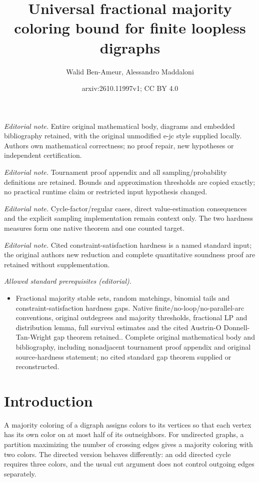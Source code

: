 \documentclass[10pt,a4paper]{article}
\title{Universal fractional majority coloring bound for finite loopless digraphs}
\author{Walid Ben-Ameur, Alessandro Maddaloni}
\date{arxiv:2610.11997v1; CC BY 4.0}
\begin{document}
\maketitle
\noindent\textit{Editorial note.} Entire original mathematical body, diagrams and embedded bibliography retained, with the original unmodified e-jc style supplied locally. Authors own mathematical correctness; no proof repair, new hypotheses or independent certification.\par\medskip
\noindent\textit{Editorial note.} Tournament proof appendix and all sampling/probability definitions are retained. Bounds and approximation thresholds are copied exactly; no practical runtime claim or restricted input hypothesis changed.\par\medskip
\noindent\textit{Editorial note.} Cycle-factor/regular cases, direct value-estimation consequences and the explicit sampling implementation remain context only. The two hardness measures form one native theorem and one counted target.\par\medskip
\noindent\textit{Editorial note.} Cited constraint-satisfaction hardness is a named standard input; the original authors new reduction and complete quantitative soundness proof are retained without supplementation.\par\medskip
\noindent\textit{Allowed standard prerequisites (editorial).}\begin{itemize}
\item Fractional majority stable sets, random matchings, binomial tails and constraint-satisfaction hardness gaps. Native finite/no-loop/no-parallel-arc conventions, original outdegrees and majority thresholds, fractional LP and distribution lemma, full survival estimates and the cited Austrin-O Donnell-Tan-Wright gap theorem retained.. Complete original mathematical body and bibliography, including nonadjacent tournament proof appendix and original source-hardness statement; no cited standard gap theorem supplied or reconstructed.
\end{itemize}\medskip
\section{Introduction}
A majority coloring of a digraph assigns colors to its vertices so that each vertex has its own color on at most half of its outneighbors. For undirected graphs, a partition maximizing the number of crossing edges gives a majority coloring with two colors. The directed version behaves differently: an odd directed cycle requires three colors, and the usual cut argument does not control outgoing edges separately.
\end{document}
